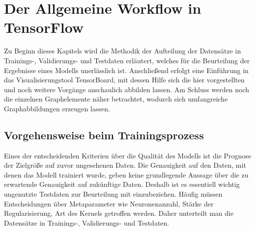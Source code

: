 \chapter{Der Allgemeine Workflow in TensorFlow}

Zu Beginn dieses Kapitels wird die Methodik der Aufteilung der Datensätze in Trainings-, Validierungs- und Testdaten erläutert, welches für die Beurteilung der Ergebnisse eines Modells unerlässlich ist. Anschließend erfolgt eine Einführung in das Visualisierungstool TensorBoard, mit dessen Hilfe sich die hier vorgestellten und noch weitere Vorgänge anschaulich abbilden lassen. Am Schluss werden noch die einzelnen Graphelemente näher betrachtet, wodurch sich umfangreiche Graphabbildungen erzeugen lassen. 


\section{Vorgehensweise beim Trainingsprozess}


Eines der entscheidenden Kriterien über die Qualität des Modells ist die Prognose der Zielgröße auf zuvor ungesehenen Daten. Die Genauigkeit auf den Daten, mit denen das Modell trainiert wurde, geben keine grundlegende Aussage über die zu erwartende Genauigkeit auf zukünftige Daten. Deshalb ist es essentiell wichtig ungenutzte Testdaten zur Beurteilung mit einzubeziehen. Häufig müssen Entscheidungen über Metaparameter wie Neuronenanzahl, Stärke der Regularisierung, Art des Kernels getroffen werden. Daher unterteilt man die Datensätze in Trainings-, Validierungs- und Testdaten. 
\vspace{10pt}

